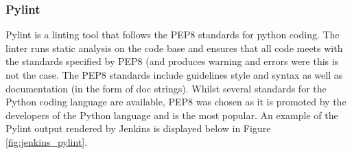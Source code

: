 \subsubsection{Pylint}
Pylint is a linting tool that follows the PEP8 standards \cite{pep8} for python coding. The linter runs static analysis on the code base and ensures that all code meets with the standards specified by PEP8 (and produces warning and errors were this is not the case. The PEP8 standards include guidelines style and syntax as well as documentation (in the form of doc strings). Whilst several standards for the Python coding language are available, PEP8 was chosen as it is promoted by the developers of the Python language and is the most popular. An example of the Pylint output rendered by Jenkins is displayed below in Figure \ref{fig:jenkins_pylint}.
\begin{figure}[h!]
\end{figure}

